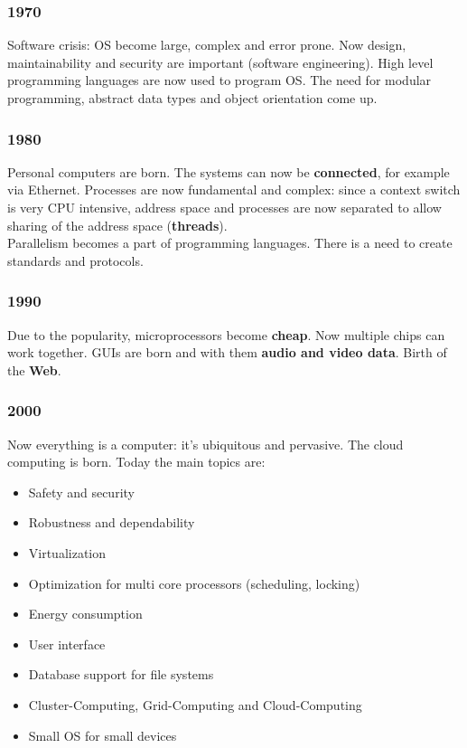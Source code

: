 \subsubsection{1970}
Software crisis: OS become large, complex and error prone. Now design, maintainability and security are important (software engineering). High level programming languages are now used to program OS.
The need for modular programming, abstract data types and object orientation come up.
\subsubsection{1980}
Personal computers are born. The systems can now be \textbf{connected}, for example via Ethernet. Processes are now fundamental and complex: since a context switch is very CPU intensive, address space and processes are now separated to allow sharing of the address space (\textbf{threads}).\\
Parallelism becomes a part of programming languages. There is a need to create standards and protocols.
\subsubsection{1990}
Due to the popularity, microprocessors become \textbf{cheap}. Now multiple chips can work together. GUIs are born and with them \textbf{audio and video data}. Birth of the \textbf{Web}.
\subsubsection{2000}
Now everything is a computer: it's ubiquitous and pervasive. The cloud computing is born. Today the main topics are:
\begin{itemize}
	\item Safety and security
	\item Robustness and dependability
	\item Virtualization
	\item Optimization for multi core processors (scheduling, locking)
	\item Energy consumption
	\item User interface
	\item Database support for file systems
	\item Cluster-Computing, Grid-Computing and Cloud-Computing
	\item Small OS for small devices
\end{itemize}